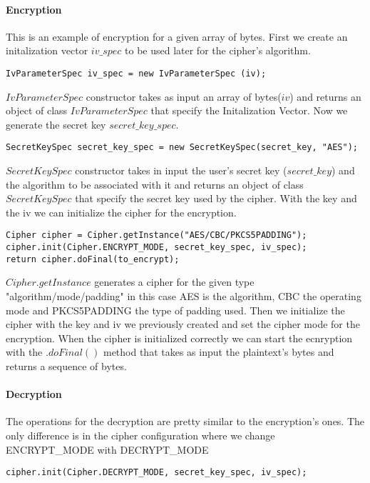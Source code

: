 \documentclass[11pt,a4paper]{article}
\begin{document}
\paragraph{Encryption}
This is an example of encryption for a given array of bytes.\newline
First we create an initalization vector $iv\_spec$ to be used later for the cipher's algorithm.
\begin{lstlisting}[backgroundcolor = \color{lightgray}]
IvParameterSpec iv_spec = new IvParameterSpec (iv);
\end{lstlisting}
$IvParameterSpec$ constructor takes as input an array of bytes($iv$) and returns an object of class $IvParameterSpec$ that specify the Initalization Vector.\newline
Now we generate the secret key $secret\_key\_spec$.
\begin{lstlisting}[backgroundcolor = \color{lightgray}]
SecretKeySpec secret_key_spec = new SecretKeySpec(secret_key, "AES");
\end{lstlisting}
$SecretKeySpec$ constructor takes in input the user's secret key ($secret\_key$) and the algorithm to be associated with it and returns an object of class $SecretKeySpec$ that specify the secret key used by the cipher.\newline
With the key and the iv we can initialize the cipher for the encryption.
\begin{lstlisting}[backgroundcolor = \color{lightgray}]
Cipher cipher = Cipher.getInstance("AES/CBC/PKCS5PADDING");
cipher.init(Cipher.ENCRYPT_MODE, secret_key_spec, iv_spec);
return cipher.doFinal(to_encrypt);
\end{lstlisting}
$Cipher.getInstance$ generates a cipher for the given type "algorithm/mode/padding" in this case AES is the algorithm, CBC the operating mode and PKCS5PADDING the type of padding used. Then we initialize the cipher with the key and iv we previously created and set the cipher mode for the encryption. When the cipher is initialized correctly we can start the ecnryption with the $.doFinal()$ method that takes as input the plaintext's bytes and returns a sequence of bytes.
\paragraph{Decryption}
The operations for the decryption are pretty similar to the encryption's ones.
The only difference is in the cipher configuration where we change ENCRYPT\_MODE with DECRYPT\_MODE
\begin{lstlisting}[backgroundcolor = \color{lightgray}]
cipher.init(Cipher.DECRYPT_MODE, secret_key_spec, iv_spec);
\end{lstlisting}
\end{document}
